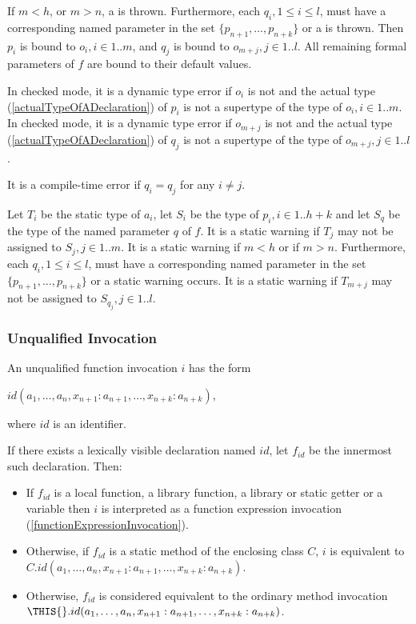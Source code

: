 \documentclass{article}
\begin{document}


\LMHash{}
If  $m < h$, or $m > n$, a  is thrown. Furthermore, each $q_i, 1 \le i \le l$,  must have a corresponding named parameter in the set $\{p_{n+1}, \ldots, p_{n +k}\}$ or a  is thrown. Then $p_i$ is bound to $o_i, i \in 1.. m$, and $q_j$  is bound to $o_{m+j}, j \in 1.. l$.  All remaining formal parameters of $f$  are bound to their default values. 


\LMHash{}
In checked mode, it is a dynamic type error if  $o_i$ is not \NULL{} and the actual type  (\ref{actualTypeOfADeclaration}) of $p_i$ is not a supertype of the type of $o_i, i \in 1.. m$. In checked mode, it is a dynamic type error if  $o_{m+j}$ is not \NULL{} and the actual type  (\ref{actualTypeOfADeclaration}) of $q_j$ is not a supertype of the type of $o_{m+j}, j \in 1.. l$.

\LMHash{}
It is a compile-time error if $q_i = q_j$ for any $i \ne j$.

\LMHash{}
Let $T_i$ be the static type of $a_i$, let $S_i$ be the type of $p_i, i \in 1 .. h+k$ and let $S_q$ be the type of the named parameter $q$ of $f$.  It is a static warning if $T_j$ may not be assigned to $S_j, j \in 1..m$.  It is a static warning if $m < h$ or if $m > n$. Furthermore, each $q_i, 1 \le i \le l$,  must have a corresponding named parameter in the set $\{p_{n+1}, \ldots, p_{n +k}\}$ or a static warning occurs.  It is a static warning if $T_{m+j}$ may not be assigned to $S_{q_j}, j \in 1 .. l$.

\subsubsection{ Unqualified Invocation}

\LMHash{}
An unqualified function invocation $i$ has the form 

$id(a_1, \ldots, a_n, x_{n+1}: a_{n+1}, \ldots, x_{n+k}: a_{n+k})$, 

where $id$ is an identifier. 

\LMHash{}
If there exists a lexically visible declaration named $id$, let $f_{id}$ be the innermost such declaration. Then:
\begin{itemize}
\item
 If $f_{id}$ is a local function, a library function, a library or static getter or a variable then $i$ is interpreted as a function expression invocation (\ref{functionExpressionInvocation}).
 \item
Otherwise, if $f_{id}$ is a static method of the enclosing class $C$, $i$ is equivalent to $C.id(a_1, \ldots , a_n, x_{n+1}: a_{n+1}, \ldots , x_{n+k}: a_{n+k})$.
\item Otherwise, $f_{id}$ is considered equivalent to the ordinary method invocation $\THIS{}.id(a_1, \ldots , a_n, x_{n+1}: a_{n+1}, \ldots , x_{n+k}: a_{n+k})$.
\end{itemize}
\end{document}
